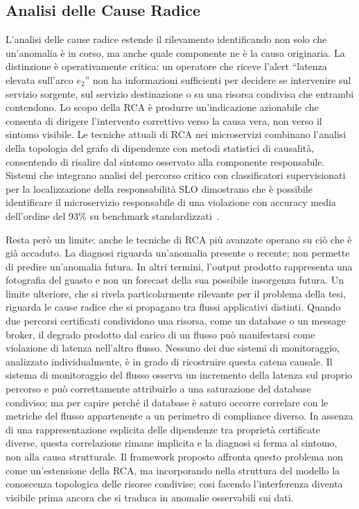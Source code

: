 \subsection{Analisi delle Cause Radice}
\label{subsec:rca}

L'analisi delle cause radice estende il rilevamento
identificando non solo che un'anomalia è in corso, ma anche quale componente ne è la causa
originaria. La distinzione è operativamente critica: un operatore che riceve l'alert ``latenza
elevata sull'arco $e_2$'' non ha informazioni sufficienti per decidere se intervenire sul
servizio sorgente, sul servizio destinazione o su una risorsa condivisa che entrambi contendono.
Lo scopo della \gls{RCA} è produrre un'indicazione azionabile che consenta di dirigere
l'intervento correttivo verso la causa vera, non verso il sintomo visibile.
Le tecniche attuali di \gls{RCA} nei microservizi combinano l'analisi della topologia del
grafo di dipendenze con metodi statistici di causalità, consentendo di risalire dal sintomo
osservato alla componente responsabile. Sistemi che integrano analisi del percorso critico con
classificatori supervisionati per la localizzazione della responsabilità \gls{SLO} dimostrano
che è possibile identificare il microservizio responsabile di una violazione con accuracy media
dell'ordine del 93\% su benchmark standardizzati~\cite{qiu2020firm}.

Resta però un limite: anche le tecniche di \gls{RCA} più avanzate operano su ciò che è già
accaduto. La diagnosi riguarda un'anomalia presente o recente; non permette di predire
un'anomalia futura. In altri termini, l'output prodotto rappresenta una fotografia del guasto
e non un forecast della sua possibile insorgenza futura.
Un limite ulteriore, che si rivela particolarmente rilevante per il problema della tesi,
riguarda le cause radice che si propagano tra flussi applicativi distinti. 
Quando due percorsi certificati condividono una risorsa, come un database o un message
broker, il degrado prodotto dal carico di un flusso può manifestarsi come violazione
di latenza nell'altro flusso. Nessuno dei due sistemi di monitoraggio, analizzato
individualmente, è in grado di ricostruire questa catena causale. Il sistema
di monitoraggio del flusso osserva un incremento della latenza sul proprio percorso e
può correttamente attribuirlo a una saturazione del database condiviso; ma per capire perché
il database è saturo occorre correlare con le metriche del flusso appartenente a un perimetro di compliance diverso. 
In assenza di una rappresentazione esplicita
delle dipendenze tra proprietà certificate diverse, questa correlazione rimane implicita e la
diagnosi si ferma al sintomo, non alla causa strutturale. Il framework proposto affronta
questo problema non come un'estensione della \gls{RCA}, ma incorporando nella struttura del modello 
la conoscenza topologica delle risorse condivise; cosi facendo l'interferenza diventa visibile prima ancora
che si traduca in anomalie osservabili sui dati.

